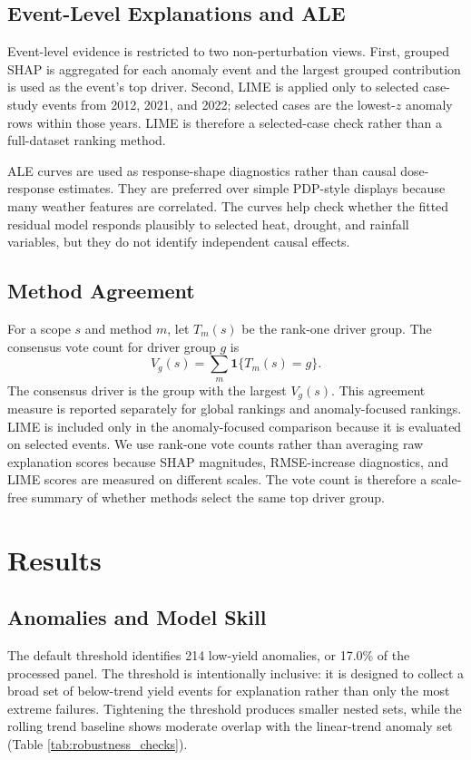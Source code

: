 \documentclass[11pt]{article}
\begin{document}
\subsection{Event-Level Explanations and ALE}
Event-level evidence is restricted to two non-perturbation views. First, grouped SHAP
is aggregated for each anomaly event and the largest grouped contribution is used as
the event's top driver. Second, LIME is applied only to selected case-study events
from 2012, 2021, and 2022; selected cases are the lowest-$z$ anomaly rows within
those years. LIME is therefore a selected-case check rather than a full-dataset
ranking method.

ALE curves are used as response-shape diagnostics rather than causal dose-response
estimates. They are preferred over simple PDP-style displays because many weather
features are correlated. The curves help check whether the fitted residual model
responds plausibly to selected heat, drought, and rainfall variables, but they do
not identify independent causal effects.



\subsection{Method Agreement}
For a scope $s$ and method $m$, let $T_m(s)$ be the rank-one driver group. The
consensus vote count for driver group $g$ is
\begin{equation}
  V_g(s) = \sum_m \mathbf{1}\{T_m(s)=g\}.
\end{equation}
The consensus driver is the group with the largest $V_g(s)$. This agreement measure
is reported separately for global rankings and anomaly-focused rankings. LIME is
included only in the anomaly-focused comparison because it is evaluated on selected
events. We use rank-one vote counts rather than averaging raw explanation scores
because SHAP magnitudes, RMSE-increase diagnostics, and LIME scores are measured on
different scales. The vote count is therefore a scale-free summary of whether
methods select the same top driver group.

\section{Results}
\subsection{Anomalies and Model Skill}
The default threshold identifies 214 low-yield anomalies, or 17.0\% of the processed
panel. The threshold is intentionally inclusive: it is designed to collect a broad set
of below-trend yield events for explanation rather than only the most extreme
failures. Tightening the threshold produces smaller nested sets, while the rolling
trend baseline shows moderate overlap with the linear-trend anomaly set
(Table \ref{tab:robustness_checks}).
\end{document}
